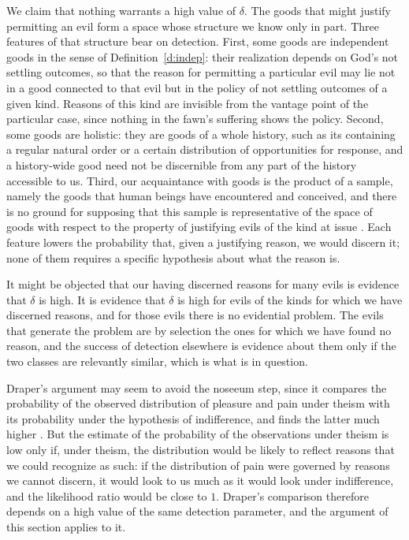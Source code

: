 \documentclass{situationist-preprint}
\begin{document}
We claim that nothing warrants a high value of $\delta$. The goods that might justify permitting an evil form a space whose structure we know only in part. Three features of that structure bear on detection. First, some goods are independent goods in the sense of Definition~\ref{d:indep}: their realization depends on God's not settling outcomes, so that the reason for permitting a particular evil may lie not in a good connected to that evil but in the policy of not settling outcomes of a given kind. Reasons of this kind are invisible from the vantage point of the particular case, since nothing in the fawn's suffering shows the policy. Second, some goods are holistic: they are goods of a whole history, such as its containing a regular natural order or a certain distribution of opportunities for response, and a history-wide good need not be discernible from any part of the history accessible to us. Third, our acquaintance with goods is the product of a sample, namely the goods that human beings have encountered and conceived, and there is no ground for supposing that this sample is representative of the space of goods with respect to the property of justifying evils of the kind at issue \citep{Bergmann2001}. Each feature lowers the probability that, given a justifying reason, we would discern it; none of them requires a specific hypothesis about what the reason is.

It might be objected that our having discerned reasons for many evils is evidence that $\delta$ is high. It is evidence that $\delta$ is high for evils of the kinds for which we have discerned reasons, and for those evils there is no evidential problem. The evils that generate the problem are by selection the ones for which we have found no reason, and the success of detection elsewhere is evidence about them only if the two classes are relevantly similar, which is what is in question.

Draper's argument may seem to avoid the noseeum step, since it compares the probability of the observed distribution of pleasure and pain under theism with its probability under the hypothesis of indifference, and finds the latter much higher \citep{Draper1989}. But the estimate of the probability of the observations under theism is low only if, under theism, the distribution would be likely to reflect reasons that we could recognize as such: if the distribution of pain were governed by reasons we cannot discern, it would look to us much as it would look under indifference, and the likelihood ratio would be close to $1$. Draper's comparison therefore depends on a high value of the same detection parameter, and the argument of this section applies to it.
\end{document}
